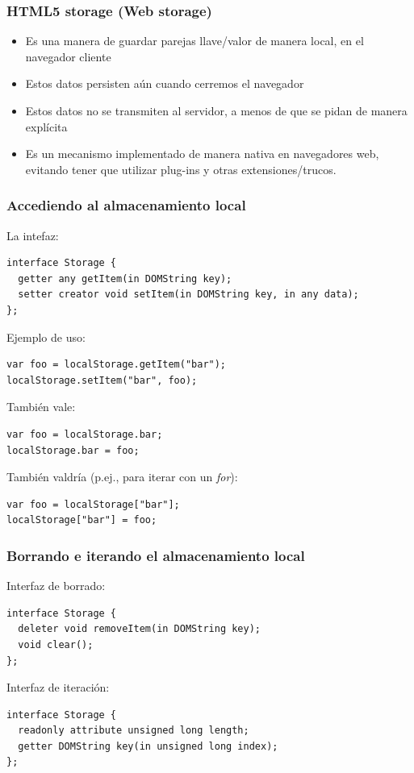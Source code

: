 \begin{frame}
\frametitle{HTML5 storage (Web storage)}

\begin{itemize}
  \item Es una manera de guardar parejas llave/valor de manera local, en el navegador cliente
  \item Estos datos persisten aún cuando cerremos el navegador
  \item Estos datos no se transmiten al servidor, a menos de que se pidan de manera explícita
  \item Es un mecanismo implementado de manera nativa en navegadores web, evitando tener que utilizar plug-ins y otras extensiones/trucos.
\end{itemize}

\end{frame}


\begin{frame}[fragile]
\frametitle{Accediendo al almacenamiento local}

La intefaz:

\begin{verbatim}
interface Storage {
  getter any getItem(in DOMString key);
  setter creator void setItem(in DOMString key, in any data);
};
\end{verbatim}

Ejemplo de uso:
\begin{verbatim}
var foo = localStorage.getItem("bar");
localStorage.setItem("bar", foo);
\end{verbatim}

También vale:
\begin{verbatim}
var foo = localStorage.bar;
localStorage.bar = foo;
\end{verbatim}


También valdría (p.ej., para iterar con un \emph{for}):
\begin{verbatim}
var foo = localStorage["bar"];
localStorage["bar"] = foo;
\end{verbatim}


\end{frame}


\begin{frame}[fragile]
\frametitle{Borrando e iterando el almacenamiento local}

Interfaz de borrado:

\begin{verbatim}
interface Storage {
  deleter void removeItem(in DOMString key);
  void clear();
};
\end{verbatim}

Interfaz de iteración:

\begin{verbatim}
interface Storage {
  readonly attribute unsigned long length;
  getter DOMString key(in unsigned long index);
};

\end{verbatim}


\end{frame}


